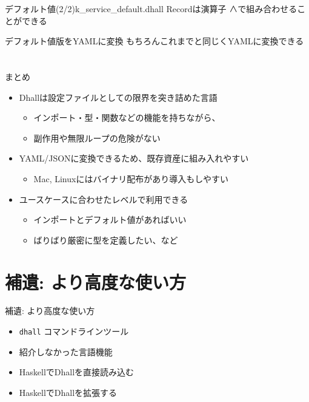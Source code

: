 \documentclass[unicode,12pt]{beamer}
\begin{document}
\begin{frame}{デフォルト値(2/2)}{\ttfamily k\_service\_default.dhall}
  Recordは演算子 {\ttfamily ∧}で組み合わせることができる
  
\end{frame}

\begin{frame}{デフォルト値版をYAMLに変換}
  もちろんこれまでと同じくYAMLに変換できる
  
\end{frame}

\section{}

\begin{frame}[plain]{まとめ}
  \begin{itemize}
  \item Dhallは\alert{設定ファイルとしての限界}を突き詰めた言語
    \begin{itemize}
    \item インポート・型・関数などの機能を持ちながら、
    \item 副作用や無限ループの危険がない
    \end{itemize}
  \item \alert{YAML/JSONに変換できる}ため、既存資産に組み入れやすい
    \begin{itemize}
    \item Mac, Linuxにはバイナリ配布があり導入もしやすい
    \end{itemize}
  \item \alert{ユースケースに合わせたレベル}で利用できる
    \begin{itemize}
    \item インポートとデフォルト値があればいい
    \item ばりばり厳密に型を定義したい、など
    \end{itemize}
  \end{itemize}
\end{frame}

\section{補遺: より高度な使い方}

\begin{frame}{補遺: より高度な使い方}
  \begin{itemize}
    \item \texttt{dhall} コマンドラインツール
    \item 紹介しなかった言語機能
    \item HaskellでDhallを直接読み込む
    \item HaskellでDhallを拡張する
  \end{itemize}
\end{frame}
\end{document}
